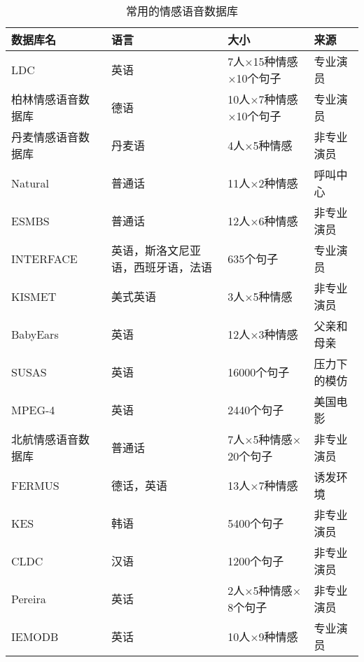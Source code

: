 \begin{table}[htb]
\centering
    \begin{minipage}[t]{1.0\linewidth} %
    \caption{常用的情感语音数据库}
    \label{tab:emo_database}
        \begin{tabularx}{\linewidth}{X<{\centering} X<{\centering} X<{\centering} X<{\centering}}
            \toprule[1.5pt]
            数据库名 & 语言 & 大小 & 来源 \\
            \midrule[1pt]
            LDC~\cite{LibermanEmotional} & 英语 & 7人$\times$15种情感$\times$10个句子 & 专业演员 \\
            柏林情感语音数据库~\cite{Burkhardt2005A} & 德语 & 10人$\times$7种情感$\times$10个句子 & 专业演员 \\
            丹麦情感语音数据库~\cite{Engberg1997Design} & 丹麦语 & 4人$\times$5种情感 & 非专业演员 \\
            Natural~\cite{Morrison2007Ensemble} & 普通话 & 11人$\times$2种情感 & 呼叫中心 \\
            ESMBS~\cite{Nogueiras2012Speech} & 普通话 & 12人$\times$6种情感 & 非专业演员 \\
            INTERFACE~\cite{Hozjan2002Interface} & 英语，斯洛文尼亚语，西班牙语，法语 & 635个句子 & 专业演员 \\
            KISMET~\cite{Breazeal2002Recognition} & 美式英语 & 3人$\times$5种情感 & 非专业演员 \\
            BabyEars~\cite{Slaney2003Baby} & 英语 & 12人$\times$3种情感 & 父亲和母亲 \\
            SUSAS~\cite{Hansen1997Getting} & 英语 & 16000个句子 & 压力下的模仿 \\
            MPEG-4~\cite{Schuller2005Speaker} & 英语 & 2440个句子 & 美国电影 \\
            北航情感语音数据库~\cite{Fu2008Speaker} & 普通话 & 7人$\times$5种情感$\times$20个句子 & 非专业演员 \\
            FERMUS \uppercase\expandafter{\romannumeral3}~\cite{Schuller2002Towards} & 德话，英语 & 13人$\times$7种情感 & 诱发环境 \\
            KES~\cite{Kim2007Speech} & 韩语 & 5400个句子 & 非专业演员 \\
            CLDC~\cite{Zhou2006Speech} & 汉语 & 1200个句子 & 非专业演员 \\
            Pereira~\cite{Pereira2000Dimensions} & 英话 & 2人$\times$5种情感$\times$8个句子 & 非专业演员 \\
            IEMODB~\cite{Busso2008IEMOCAP} & 英话 & 10人$\times$9种情感 & 专业演员 \\
            \bottomrule[1.5pt]
        \end{tabularx}
    \end{minipage}
\end{table}

